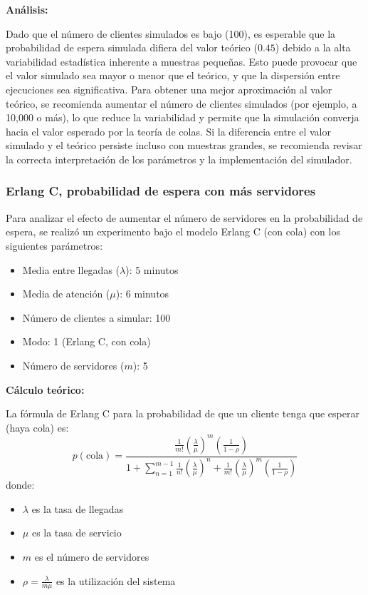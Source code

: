 \documentclass{article}
\begin{document}
\textbf{Análisis:}

Dado que el número de clientes simulados es bajo (100), es esperable que la probabilidad de espera simulada difiera del valor teórico ($0.45$) debido a la alta variabilidad estadística inherente a muestras pequeñas. Esto puede provocar que el valor simulado sea mayor o menor que el teórico, y que la dispersión entre ejecuciones sea significativa. Para obtener una mejor aproximación al valor teórico, se recomienda aumentar el número de clientes simulados (por ejemplo, a 10,000 o más), lo que reduce la variabilidad y permite que la simulación converja hacia el valor esperado por la teoría de colas. Si la diferencia entre el valor simulado y el teórico persiste incluso con muestras grandes, se recomienda revisar la correcta interpretación de los parámetros y la implementación del simulador.

\subsubsection{Erlang C, probabilidad de espera con más servidores}

Para analizar el efecto de aumentar el número de servidores en la probabilidad de espera, se realizó un experimento bajo el modelo Erlang C (con cola) con los siguientes parámetros:

\begin{itemize}
    \item Media entre llegadas ($\lambda$): 5 minutos
    \item Media de atención ($\mu$): 6 minutos
    \item Número de clientes a simular: 100
    \item Modo: 1 (Erlang C, con cola)
    \item Número de servidores ($m$): 5
\end{itemize}

\textbf{Cálculo teórico:}

La fórmula de Erlang C para la probabilidad de que un cliente tenga que esperar (haya cola) es:
\begin{equation*}
p(\text{cola}) = \frac{\frac{1}{m!}\left(\frac{\lambda}{\mu}\right)^m \left( \frac{1}{1-\rho} \right)}{1 + \sum_{n=1}^{m-1} \frac{1}{n!}\left(\frac{\lambda}{\mu}\right)^n + \frac{1}{m!}\left(\frac{\lambda}{\mu}\right)^m \left( \frac{1}{1-\rho} \right)}
\end{equation*}
donde:
\begin{itemize}
    \item $\lambda$ es la tasa de llegadas
    \item $\mu$ es la tasa de servicio
    \item $m$ es el número de servidores
    \item $\rho = \frac{\lambda}{m\mu}$ es la utilización del sistema
\end{itemize}
\end{document}
